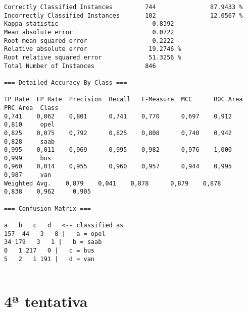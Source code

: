 \documentclass[
	article,			%
	11pt,				%
	oneside,			%
	a4paper,			%
	english,			%
	brazil,				%
	sumario=tradicional
	]{abntex2}
\begin{document}
\begin{lstlisting}
Correctly Classified Instances         744               87.9433 %
Incorrectly Classified Instances       102               12.0567 %
Kappa statistic                          0.8392
Mean absolute error                      0.0722
Root mean squared error                  0.2222
Relative absolute error                 19.2746 %
Root relative squared error             51.3256 %
Total Number of Instances              846     

=== Detailed Accuracy By Class ===

TP Rate  FP Rate  Precision  Recall   F-Measure  MCC      ROC Area  PRC Area  Class
0,741    0,062    0,801      0,741    0,770      0,697    0,912     0,810     opel
0,825    0,075    0,792      0,825    0,808      0,740    0,942     0,828     saab
0,995    0,011    0,969      0,995    0,982      0,976    1,000     0,999     bus
0,960    0,014    0,955      0,960    0,957      0,944    0,995     0,987     van
Weighted Avg.    0,879    0,041    0,878      0,879    0,878      0,838    0,962     0,905     

=== Confusion Matrix ===

a   b   c   d   <-- classified as
157  44   3   8 |   a = opel
34 179   3   1 |   b = saab
0   1 217   0 |   c = bus
5   2   1 191 |   d = van


\end{lstlisting}

\section{4ª tentativa}
\end{document}
